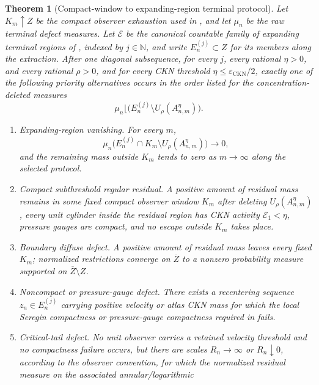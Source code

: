 \documentclass[11pt]{amsart}
\numberwithin{equation}{section}
\theoremstyle{plain}
\newtheorem{theorem}{Theorem}[section]
\theoremstyle{definition}
\theoremstyle{remark}
\newcommand{\eps}{\varepsilon}
\newcommand{\CKN}{\mathrm{CKN}}
\newcommand{\calE}{\mathcal E}
\begin{document}
\begin{theorem}[Compact-window to expanding-region terminal protocol]
\label{lem:compact-window-expanding-region-protocol}
Let \(K_m\uparrow Z\) be the compact observer exhaustion used in
, and let \(\mu_n\) be the raw terminal defect
measures.  Let \(\mathcal E\) be the canonical countable family of expanding
terminal regions of , indexed by
\(j\in\mathbb N\), and write \(E_n^{(j)}\subset Z\) for its members along the
extraction.  After one diagonal subsequence, for every \(j\), every rational
\(\eta>0\), and every rational \(\rho>0\), and for every CKN threshold
\(\eta\le\eps_{\CKN}/2\), exactly one of the following \emph{priority
alternatives} occurs in the order listed for the concentration-deleted
measures
\[
   \mu_n\lfloor\bigl(E_n^{(j)}\setminus U_\rho(A_{n,m}^{\eta})\bigr).
\]
\begin{enumerate}[label=\textup{(\alph*)}]
   \item \emph{Expanding-region vanishing.}  For every \(m\),
   \[
      \mu_n\bigl(E_n^{(j)}\cap K_m\setminus U_\rho(A_{n,m}^{\eta})\bigr)
      \longrightarrow0,
   \]
   and the remaining mass outside \(K_m\) tends to zero as \(m\to\infty\) along
   the selected protocol.
   \item \emph{Compact subthreshold regular residual.}
   A positive amount of residual mass remains in some fixed compact
   observer window \(K_m\) after deleting \(U_\rho(A_{n,m}^{\eta})\), every
   unit cylinder inside the residual region has CKN activity \(\calE_1<\eta\),
   pressure gauges are compact, and no escape outside \(K_m\) takes place.
   \item \emph{Boundary diffuse defect.}  A positive amount of residual mass
   leaves every fixed \(K_m\); normalized restrictions converge on
   \(\overline Z\) to a nonzero probability measure supported on
   \(\overline Z\setminus Z\).
   \item \emph{Noncompact or pressure-gauge defect.}  There exists a recentering
   sequence \(z_n\in E_n^{(j)}\) carrying positive velocity or atlas CKN mass for
   which the local Seregin compactness or pressure-gauge compactness required in
    fails.
   \item \emph{Critical-tail defect.}  No unit observer carries a retained
   velocity threshold and no compactness failure occurs, but there are scales
   \(R_n\to\infty\) or \(R_n\downarrow0\), according to the observer convention,
   for which the normalized residual measure on the associated annular/logarithmic

\end{enumerate}
\end{theorem}
\end{document}
